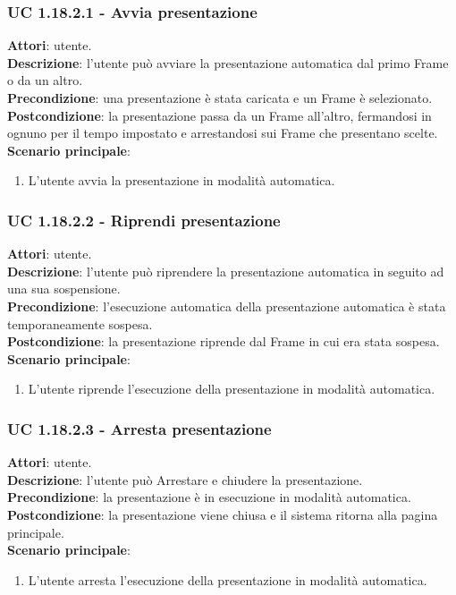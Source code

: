	\subsubsection{UC 1.18.2.1 - Avvia presentazione}{
		\label{uc1.18.2.1}
		\textbf{Attori}: utente. \\
		\textbf{Descrizione}: l'utente può avviare la presentazione automatica dal primo Frame o da un altro. \\
		\textbf{Precondizione}: una presentazione è stata caricata e un Frame è selezionato.	\\
		\textbf{Postcondizione}: la presentazione passa da un Frame all'altro, fermandosi in ognuno per il tempo impostato e arrestandosi sui Frame che presentano scelte.	\\
		\textbf{Scenario principale}:
		\begin{enumerate}
			\item L'utente avvia la presentazione in modalità automatica.
		\end{enumerate}
	}
	\subsubsection{UC 1.18.2.2 - Riprendi presentazione}{
		\label{uc1.18.2.2}
		\textbf{Attori}: utente. \\
		\textbf{Descrizione}: l'utente può riprendere la presentazione automatica in seguito ad una sua sospensione. \\
		\textbf{Precondizione}: l'esecuzione automatica della presentazione automatica è stata temporaneamente sospesa.	\\
		\textbf{Postcondizione}: la presentazione riprende dal Frame in cui era stata sospesa.\\
		\textbf{Scenario principale}:
		\begin{enumerate}
			\item L'utente riprende l'esecuzione della presentazione in modalità automatica.
		\end{enumerate}		
	}
	\subsubsection{UC 1.18.2.3 - Arresta presentazione}{
		\label{uc1.18.2.3}
		\textbf{Attori}: utente. \\
		\textbf{Descrizione}: l'utente può Arrestare e chiudere la presentazione. \\
		\textbf{Precondizione}: la presentazione è in esecuzione in modalità automatica.	\\
		\textbf{Postcondizione}: la presentazione viene chiusa e il sistema ritorna alla pagina principale.\\
		\textbf{Scenario principale}:
		\begin{enumerate}
			\item L'utente arresta l'esecuzione della presentazione in modalità automatica.
		\end{enumerate}		
	}
